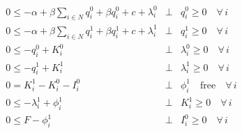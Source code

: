\documentclass[11pt,a4paper]{article}
\begin{document}
\begin{eqnarray*}
	0 \leq -\alpha + \beta \sum_{i\in N}q_i^0 + \beta q_i^0+ c + \lambda_i^0 &\bot& q_i^0 \geq 0\quad\forall\, i\\
	0 \leq -\alpha + \beta \sum_{i\in N}q_i^1 + \beta q_i^1+ c + \lambda_i^1 &\bot& q_i^1 \geq 0\quad\forall\, i\\
	0 \leq -q_i^0 + K_i^0 &\bot& \lambda_i^0 \geq 0 \quad\forall\, i \\
        0 \leq -q_i^1 + K_i^1 &\bot& \lambda_i^1 \geq 0 \quad\forall\, i\\
        0 = K_i^1 - K_i^0 - I_i^0 &\bot& \phi_i^1 \quad \mbox{free} \quad\forall\, i \\
        0 \leq -\lambda_i^1 + \phi_i^1 &\bot& K_i^1 \geq 0 \quad\forall\, i\\
        0 \leq F - \phi_i^1 &\bot& I_i^0 \geq 0 \quad\forall\, i
\end{eqnarray*}
\end{document}
